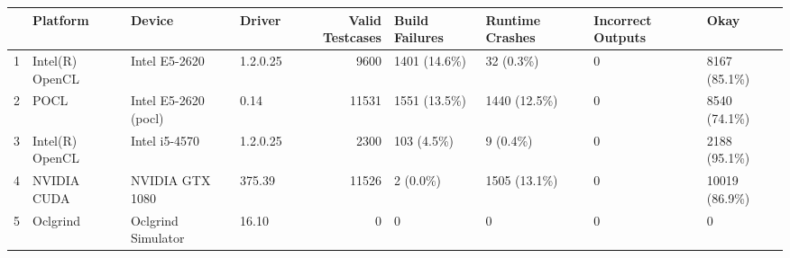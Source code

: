 \begin{tabular}{llllrllll}
\toprule
{} &         Platform &                Device &    Driver &  Valid Testcases & Build Failures & Runtime Crashes & Incorrect Outputs &           Okay \\
\midrule
1 &  Intel(R) OpenCL &         Intel E5-2620 &  1.2.0.25 &             9600 &   1401 (14.6\%) &       32 (0.3\%) &                 0 &   8167 (85.1\%) \\
2 &             POCL &  Intel E5-2620 (pocl) &      0.14 &            11531 &   1551 (13.5\%) &    1440 (12.5\%) &                 0 &   8540 (74.1\%) \\
3 &  Intel(R) OpenCL &         Intel i5-4570 &  1.2.0.25 &             2300 &     103 (4.5\%) &        9 (0.4\%) &                 0 &   2188 (95.1\%) \\
4 &      NVIDIA CUDA &       NVIDIA GTX 1080 &    375.39 &            11526 &       2 (0.0\%) &    1505 (13.1\%) &                 0 &  10019 (86.9\%) \\
5 &         Oclgrind &    Oclgrind Simulator &     16.10 &                0 &              0 &               0 &                 0 &              0 \\
\bottomrule
\end{tabular}
